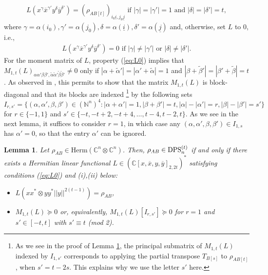\documentclass[11pt]{article}
\newcommand{\N}{\ensuremath{\mathbb{N}}}   %
\newcommand{\C}{\ensuremath{\mathbb{C}}} %
\newcommand{\Herm}{\mathrm{Herm}}
\newcommand{\DPS}{\text{\rm DPS}}
\newcommand{\ox}{\overline x}
\newcommand{\oy}{\overline y}
\newcommand{\ot}{\otimes}
\newcommand{\ui}{\underline{i}}
\newcommand{\uj}{\underline{j}}
\theoremstyle{plain}
\newtheorem{lemma}[satz]{Lemma}
\begin{document}
  \begin{align}\label{eq:Lnot0}
  L(x^\gamma \ox^{\gamma'}y^\delta \oy^{\delta'})= (\rho_{AB[t]})_{i_0\ui,j_0\uj} \text{ if } 
  |\gamma|=|\gamma'|=1 \text{ and }   |\delta|=|\delta'|=t,
    \end{align}
 where   $\gamma=\alpha(i_0),\gamma'=\alpha(j_0), \delta=\alpha(\ui), \delta'=\alpha(\uj)$
    and, otherwise, set  $L$ to 0, i.e.,
  \begin{align}\label{eq:L0}
  L(x^\gamma \ox^{\gamma'}y^\delta \oy^{\delta'})=0 \text{ if } |\gamma|\ne |\gamma'| \text{ or } |\delta|\ne |\delta'|. %
    \end{align}
  For the moment matrix of $L$,  property (\ref{eq:L0}) implies  that $M_{1,t}(L)_{\alpha\alpha'\beta\beta',\tilde\alpha\tilde\alpha'\tilde\beta\tilde\beta'}\not=0$ only if $|\alpha+\tilde\alpha'|=|\alpha'+\tilde\alpha|=1$ and $|\beta+\tilde\beta'|=|\beta'+\tilde\beta|=t$. 
  As observed in \cite[Section 5.2]{GLS_2021}, this permits to show that the matrix $M_{1,t}(L)$ is block-diagonal and that its  blocks are indexed%
  \footnote{As we see  in the proof of Lemma \ref{lem:DPSmom}, the principal submatrix of    $M_{1,t}(L)$ indexed by   $I_{1,s'}$ corresponds to applying the partial transpose $T_{B[s]}$ to $\rho_{AB[t]}$, when $s'=t-2s$. This explains why we use the letter $s'$ here.}
  by the following sets 
  $$I_{r,s'}=\{(\alpha,\alpha',\beta,\beta')\in(\N^n)^4:|\alpha+\alpha'|=1, |\beta+\beta'|=t, |\alpha|-|\alpha'|=r, |\beta|-|\beta'|=s'\}$$ for $r\in\{-1,1\}$ and $s'\in\{-t, -t+2,-t+4,\dots,t-4,t-2,t\}$. As we see in the next lemma, it suffices to consider $r=1$, in which case any $(\alpha,\alpha',\beta,\beta')\in I_{1,s}$ has $\alpha'=0$, so that the entry $\alpha'$ can be ignored. 
      
\begin{lemma} \cite{GLS_2021}\label{lem:DPSmom}
    Let $\rho_{AB}\in\Herm(\C^n\ot\C^n)$. Then, $\rho_{AB}\in\DPS^{(t)}_n$ if and only if there exists a Hermitian linear functional $L\in (\C[x,\ox,y,\oy]_{2,2t})^*$ satisfying conditions (\ref{eq:L0})  and    (i),(ii) below:     \begin{itemize}
        \item[(i)] $L(xx^*\ot yy^*||y||^{2(t-1)}) = \rho_{AB}$,
        \item[(ii)] $M_{1,t}(L)\succeq 0$ or, equivalently, 
        $M_{1,t}(L)[I_{r,s'}]\succeq 0$ for  $r=1$ and $s'\in [-t,t]$ with $s'\equiv t$ (mod 2).
       \end{itemize}
\end{lemma}
\end{document}

